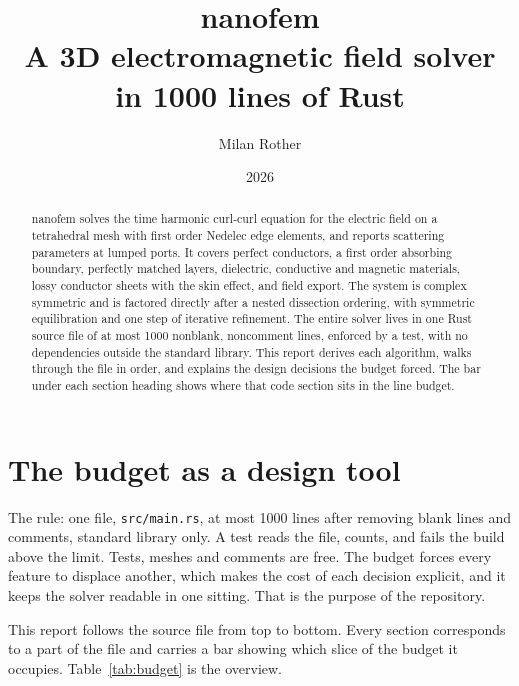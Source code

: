 \documentclass[11pt]{article}
\title{\textbf{nanofem}\\[4pt]\large A 3D electromagnetic field solver in 1000 lines of Rust}
\author{Milan Rother}
\date{2026}
\begin{document}
\maketitle

\begin{abstract}
\noindent
nanofem solves the time harmonic curl-curl equation for the electric field
on a tetrahedral mesh with first order Nedelec edge elements, and reports
scattering parameters at lumped ports. It covers perfect conductors, a
first order absorbing boundary, perfectly matched layers, dielectric,
conductive and magnetic materials, lossy conductor sheets with the skin
effect, and field export. The system is complex symmetric and is factored
directly after a nested dissection ordering, with symmetric equilibration
and one step of iterative refinement. The entire solver lives in one Rust
source file of at most 1000 nonblank, noncomment lines, enforced by a test,
with no dependencies outside the standard library. This report derives each
algorithm, walks through the file in order, and explains the design
decisions the budget forced. The bar under each section heading shows where
that code section sits in the line budget.
\end{abstract}

\section{The budget as a design tool}

The rule: one file, \texttt{src/main.rs}, at most 1000 lines after removing
blank lines and comments, standard library only. A test reads the file,
counts, and fails the build above the limit. Tests, meshes and comments are
free. The budget forces every feature to displace another, which makes the
cost of each decision explicit, and it keeps the solver readable in one
sitting. That is the purpose of the repository.

This report follows the source file from top to bottom. Every section
corresponds to a part of the file and carries a bar showing which slice of
the budget it occupies. Table~\ref{tab:budget} is the overview.
\end{document}
